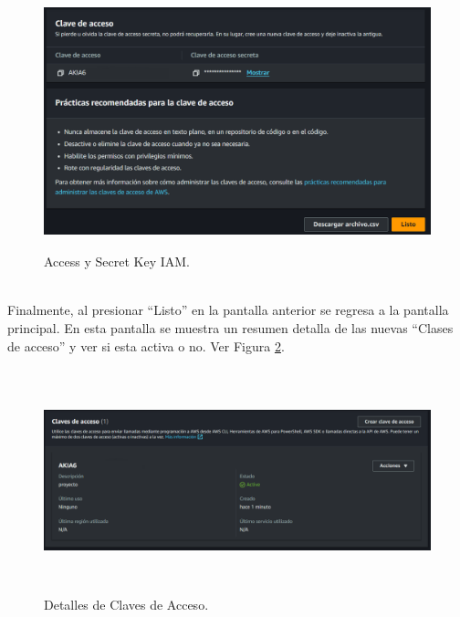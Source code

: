 \documentclass[a4paper,10pt, oneside, titlepage]{article}
\begin{document}
	\begin{figure}[!h]
		\centering
		\includegraphics[width = 1\linewidth, height = 7.4cm]{Access_Secret_Key_IAM.png}
		\caption{Access y Secret Key IAM.}
		\label{Access_Secret_Key_IAM}
	\end{figure} \\
	\indent Finalmente, al presionar ``Listo'' en la pantalla anterior se regresa a la pantalla principal. En esta pantalla se muestra un resumen detalla de las nuevas ``Clases de acceso'' y ver si esta activa o no. Ver Figura \ref{Detalle_Clave_IAM}.
	\begin{figure}[!h]
		\centering
		\includegraphics[width = 1\linewidth, height = 6.5cm]{Detalle_Clave_IAM.png}
		\caption{Detalles de Claves de Acceso.}
		\label{Detalle_Clave_IAM}
	\end{figure}
\end{document}
